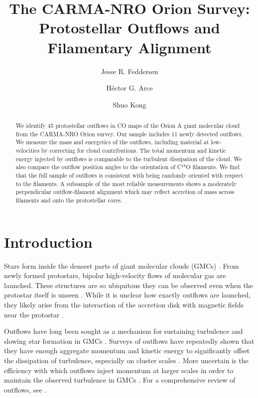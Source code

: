 \documentclass[twocolumn]{aastex63}
\newcommand{\numnew}{11}
\begin{document}
\title{The CARMA-NRO Orion Survey: Protostellar Outflows and Filamentary Alignment}

\author{Jesse R. Feddersen}
\author{H\'ector G. Arce}
\author{Shuo Kong}


\begin{abstract}
We identify 45 protostellar outflows in CO maps of the Orion A giant molecular cloud from the CARMA-NRO Orion survey. Our sample includes \numnew{} newly detected outflows. We measure the mass and energetics of the outflows, including material at low-velocities by correcting for cloud contributions. The total momentum and kinetic energy injected by outflows is comparable to the turbulent dissipation of the cloud. We also compare the outflow position angles to the orientation of C$^{18}$O filaments. We find that the full sample of outflows is consistent with being randomly oriented with respect to the filaments. A subsample of the most reliable measurements shows a moderately perpendicular outflow-filament alignment which may reflect accretion of mass across filaments and onto the protostellar cores.
\end{abstract}


\section{Introduction}
Stars form inside the densest parts of giant molecular clouds (GMCs) \citep{McKee07}. From newly formed protostars, bipolar high-velocity flows of molecular gas are launched. These structures are so ubiquitous they can be observed even when the protostar itself is unseen \citep{Kong19}. While it is unclear how exactly outflows are launched, they likely arise from the interaction of the accretion disk with magnetic fields near the protostar \citep[e.g.][]{Konigl00,Shu00,Frank14}.

Outflows have long been sought as a mechanism for sustaining turbulence and slowing star formation in GMCs \citep{Nakamura07,Carroll09,Federrath15}. Surveys of outflows have repeatedly shown that they have enough aggregate momentum and kinetic energy to significantly offset the dissipation of turbulence, especially on cluster scales \citep{Arce10,Nakamura11,Plunkett13,Plunkett15,Li15}. More uncertain is the efficiency with which outflows inject momentum at larger scales in order to maintain the observed turbulence in GMCs \citep{Brunt09,Padoan09,Carroll10}. For a comprehensive review of outflows, see \citet{Bally16}.
\end{document}

